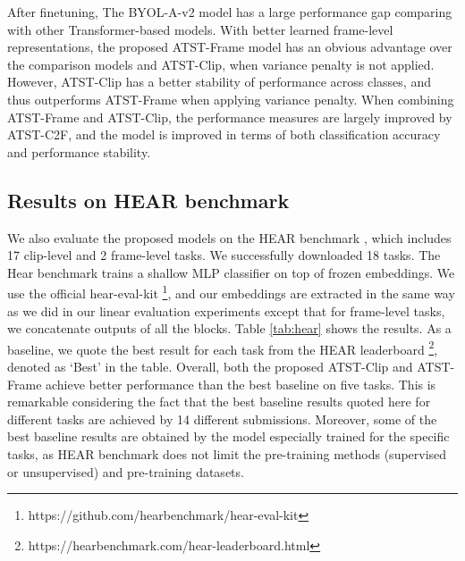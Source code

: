 After finetuning, The BYOL-A-v2 model has a large performance gap comparing with other Transformer-based models. 
With better learned frame-level representations, the proposed ATST-Frame model has an obvious advantage over the comparison models and ATST-Clip, when variance penalty is not applied. However, ATST-Clip has a better stability of performance across classes, and thus outperforms ATST-Frame when applying variance penalty. When combining ATST-Frame and ATST-Clip, the performance measures are largely improved by ATST-C2F, and the model is improved in terms of both classification accuracy and performance stability.  




\subsection{Results on HEAR benchmark} We also evaluate the proposed models on the HEAR benchmark \cite{turian_hear_2022}, which includes 17 clip-level and 2 frame-level tasks. We successfully downloaded 18 tasks. The Hear benchmark trains a shallow MLP classifier on top of frozen embeddings. We use the official hear-eval-kit \footnote{https://github.com/hearbenchmark/hear-eval-kit}, and our embeddings are extracted in the same way as we did in our linear evaluation experiments except that for frame-level tasks, we concatenate outputs of all the blocks. 
Table \ref{tab:hear} shows the results. As a baseline, we quote the best result for each task from the HEAR leaderboard \footnote{https://hearbenchmark.com/hear-leaderboard.html}, denoted as `Best' in the table.  Overall, both the proposed ATST-Clip and ATST-Frame achieve better performance than the best baseline on  five tasks. This is remarkable considering the fact that the best baseline results quoted here for different tasks are achieved by 14 different submissions. Moreover, some of the best baseline results are obtained by the model especially trained for the specific tasks, as HEAR benchmark does not limit the pre-training methods (supervised or unsupervised) and pre-training datasets. 

